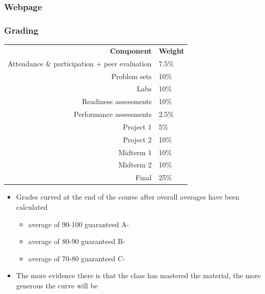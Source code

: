 \documentclass[slidestop,compress,mathserif,12pt,t,professionalfonts,xcolor=table]{beamer}
\begin{document}

\begin{frame}
\frametitle{Webpage}

\vfill

\centering
{\Large 
{}
}

\vfill

\end{frame}


\begin{frame}
\frametitle{Grading}

\begin{center}
\renewcommand\arraystretch{1.25}
{\scriptsize
\begin{tabular}{ r | l }
\textbf{Component} & \textbf{Weight} \\
Attendance \& participation + peer evaluation	& 7.5\% \\
Problem sets							& 10\%  \\ 
Labs									& 10\% \\    
Readiness assessments					& 10\%   \\  
Performance assessments 				& 2.5\%  \\  
Project 1								& 5\%   \\   
Project 2								& 10\% \\   
Midterm 1								& 10\% \\    
Midterm 2 							& 10\% \\    
Final 								& 25\%     
\end{tabular}
}
\end{center}

\begin{itemize}

\item Grades curved at the end of the course after overall averages have been calculated
\begin{itemize}
\item average of 90-100 guaranteed A-
\item average of 80-90 guaranteed B-
\item average of 70-80 guaranteed C-
\end{itemize}

\item The more evidence there is that the class has mastered the material, the more generous the curve will be
\end{itemize}

\end{frame}
\end{document}
